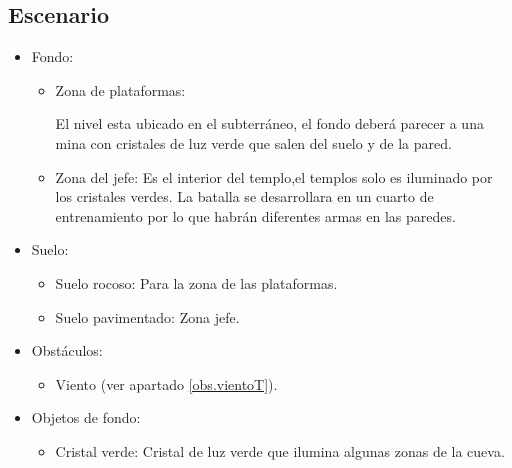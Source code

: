 \begin{itemize}
\subsection{Escenario}
\begin{itemize} 
        \item Fondo:
                \begin{itemize}
                        \item Zona de plataformas:
\\
\par
El nivel esta ubicado en el subterráneo, el fondo deberá parecer a una mina con cristales de luz verde que salen del suelo y de la pared.
                        \item Zona del jefe:
Es el interior del templo,el templos solo es iluminado por los cristales verdes. La batalla se desarrollara en un cuarto de entrenamiento por lo que habrán diferentes armas en las paredes.
                \end{itemize}
        \item Suelo:
                \begin{itemize}
                        \item Suelo rocoso: Para la zona de las plataformas.
                        \item Suelo pavimentado: Zona jefe.
                \end{itemize}
	  \item Obstáculos:
                \begin{itemize}
                        \item Viento (ver apartado \ref{obs.vientoT}).
                \end{itemize}
        \item Objetos de fondo:
                \begin{itemize}
                        \item Cristal verde: Cristal de luz verde que ilumina algunas zonas de la cueva.
                \end{itemize}
\end{itemize}   


\end{itemize}
